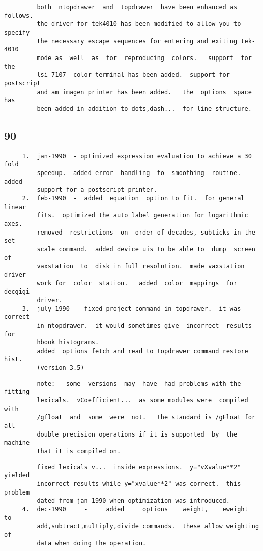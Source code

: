 \begin{verbatim}
         both  ntopdrawer  and  topdrawer  have been enhanced as follows.
         the driver for tek4010 has been modified to allow you to specify
         the necessary escape sequences for entering and exiting tek-4010
         mode as  well  as  for  reproducing  colors.   support  for  the
         lsi-7107  color terminal has been added.  support for postscript
         and am imagen printer has been added.   the  options  space  has
         been added in addition to dots,dash...  for line structure.  
\end{verbatim}
\subsection{90}
\begin{verbatim}
     1.  jan-1990  - optimized expression evaluation to achieve a 30 fold
         speedup.  added error  handling  to  smoothing  routine.   added
         support for a postscript printer.  
     2.  feb-1990  -  added  equation  option to fit.  for general linear
         fits.  optimized the auto label generation for logarithmic axes.
         removed  restrictions  on  order of decades, subticks in the set
         scale command.  added device uis to be able to  dump  screen  of
         vaxstation  to  disk in full resolution.  made vaxstation driver
         work for  color  station.   added  color  mappings  for  decgigi
         driver.  
     3.  july-1990  - fixed project command in topdrawer.  it was correct
         in ntopdrawer.  it would sometimes give  incorrect  results  for
         hbook histograms.  
         added  options fetch and read to topdrawer command restore hist.
         (version 3.5) 
\end{verbatim}

\begin{verbatim}
         note:   some  versions  may  have  had problems with the fitting
         lexicals.  vCoefficient...  as some modules were  compiled  with
         /gfloat  and  some  were  not.   the standard is /gFloat for all
         double precision operations if it is supported  by  the  machine
         that it is compiled on.  
\end{verbatim}

\begin{verbatim}
         fixed lexicals v...  inside expressions.  y="vXvalue**2" yielded
         incorrect results while y="xvalue**2" was correct.  this problem
         dated from jan-1990 when optimization was introduced.  
     4.  dec-1990     -     added     options    weight,    eweight    to
         add,subtract,multiply,divide commands.  these allow weighting of
         data when doing the operation.  
\end{verbatim}

